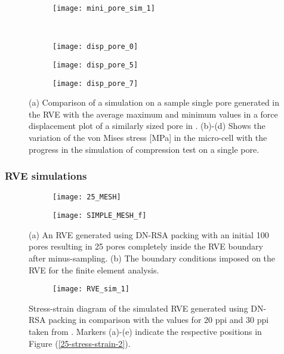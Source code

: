 \begin{figure}
	\centering
	\begin{subfigure}[b]{0.45\textwidth}
		\texttt{[image: mini\_pore\_sim\_1]}
		\caption{}
	\end{subfigure}\\
	\begin{subfigure}[b]{0.33\textwidth}
		\texttt{[image: disp\_pore\_0]}
		\caption{}
	\end{subfigure}
	\begin{subfigure}[b]{0.28\textwidth}
		\texttt{[image: disp\_pore\_5]}
		\caption{}
	\end{subfigure}
	\begin{subfigure}[b]{0.35\textwidth}
		\texttt{[image: disp\_pore\_7]}
		\caption{}
\end{subfigure}
	\caption{(a) Comparison of a simulation on a sample single pore generated in the RVE with the average maximum and minimum values in a force displacement plot of a similarly sized pore in \cite{heinzeExperimentalNumericalInvestigation2018}. (b)-(d) Shows the variation of the von Mises stress [MPa] in the micro-cell with the progress in the simulation of compression test on a single pore. 
	}\label{force_disp}
\end{figure}


\subsubsection*{RVE simulations}

\begin{figure}
	\centering
	\begin{subfigure}[b]{0.33\textwidth}
		\texttt{[image: 25\_MESH]}
		\caption{}
	\end{subfigure}
	\begin{subfigure}[b]{0.33\textwidth}
		\texttt{[image: SIMPLE\_MESH\_f]}
		\caption{}
	\end{subfigure}
	\caption{(a) An RVE generated using DN-RSA packing with an initial 100 pores resulting in 25 pores completely inside the RVE boundary after minus-sampling. (b) The boundary conditions imposed on the RVE for the finite element analysis. }\label{25_mesh}
\end{figure}

\begin{figure}
	\centering
	\begin{subfigure}[b]{0.45\textwidth}
		\texttt{[image: RVE\_sim\_1]}
	\end{subfigure}
	\caption{Stress-strain diagram of the simulated RVE generated using DN-RSA packing in comparison with the values for 20 ppi and 30 ppi taken from \cite{jungMicrostructuralCharacterisationExperimental2017}. Markers (a)-(e) indicate the respective positions in Figure (\ref{25-stress-strain-2}). 
	}\label{25-stress-strain}
\end{figure}

